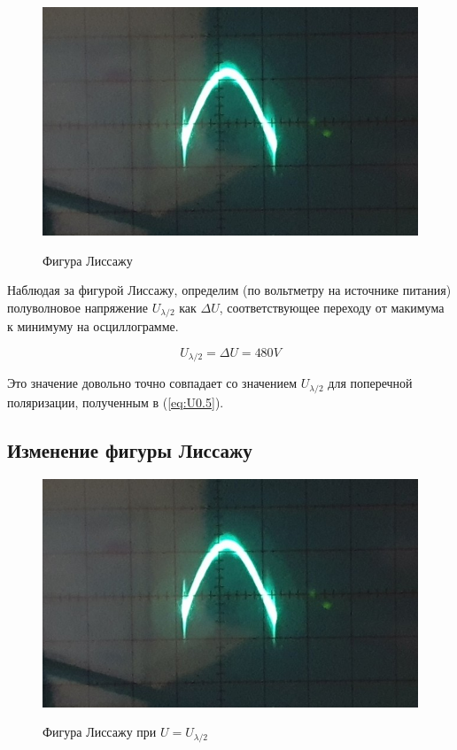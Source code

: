 \documentclass{article}
\begin{document}
\begin{figure}[H]
  \centering
  \includegraphics[width=\textwidth]{L1.jpg}\label{fig:L}
  \caption{Фигура Лиссажу}
\end{figure}

Наблюдая за фигурой Лиссажу, определим (по вольтметру на источнике питания) полуволновое напряжение 
\(U_{\lambda/2}\) как \(\Delta U\), соответствующее переходу от макимума к минимуму на осциллограмме.

\[ U_{\lambda/2} = \Delta U = 480 V\]

Это значение довольно точно совпадает со значением \(U_{\lambda/2}\) для поперечной поляризации, полученным
в (\ref{eq:U0.5}).

\subsection{Изменение фигуры Лиссажу}


\begin{figure}[H]
  \centering
  \includegraphics[width=\textwidth]{L1.jpg}\label{fig:L1}
  \caption{Фигура Лиссажу при \(U = U_{\lambda/2}\)}
\end{figure}
\end{document}
